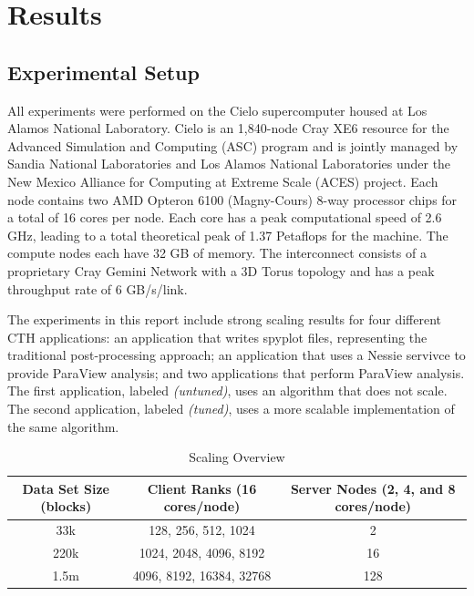\section{Results}
\label{sec:Results}


\subsection{Experimental Setup}

All experiments were performed on the Cielo supercomputer housed at Los Alamos
National Laboratory.  Cielo is an 1,840-node Cray XE6 resource for the Advanced
Simulation and Computing (ASC) program and is jointly managed by Sandia National 
Laboratories and Los Alamos National Laboratories under the New Mexico
Alliance for Computing at Extreme Scale (ACES) project.  Each node contains
two AMD Opteron 6100 (Magny-Cours) 8-way processor chips for a total of 16 cores
per node.  Each core has a peak computational speed of 2.6 GHz, leading to a total 
theoretical peak of 1.37 Petaflops for the machine. The compute nodes each
have 32 GB of memory.  The interconnect consists of a proprietary Cray Gemini
Network with a 3D Torus topology and has a peak throughput rate of 6 GB/s/link. 

The experiments in this report include strong scaling results for four different
CTH applications: an application that writes spyplot files, representing the traditional 
post-processing approach; an application that uses a Nessie servivce to provide \intransit
ParaView analysis; and two applications that perform ParaView \insitu analysis.  The first 
\insitu application, labeled \emph{\insitu (untuned)}, uses an algorithm that does not scale.
The second \insitu application, labeled \emph{\insitu (tuned)}, uses a more
scalable implementation of the same algorithm.  

\begin{table}

\caption{Scaling Overview}
\label{tab:ScalingOverview}

\centering{}%
\begin{tabular}{|c|c|c|}
\hline 
Data Set Size (blocks) & Client Ranks (16 cores/node) & Server Nodes (2, 4, and 8 cores/node)\tabularnewline
\hline 
\hline 
33k & 128, 256, 512, 1024 & 2\tabularnewline
\hline 
220k & 1024, 2048, 4096, 8192 & 16\tabularnewline
\hline 
1.5m & 4096, 8192, 16384, 32768 & 128\tabularnewline
\hline 
\end{tabular}
\end{table}

